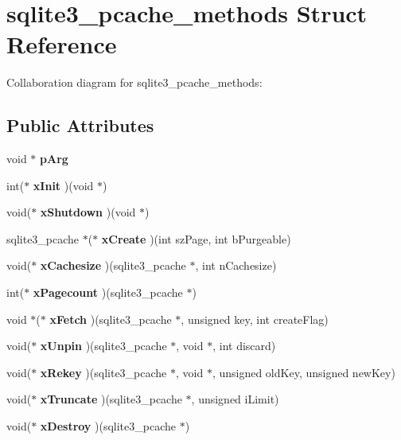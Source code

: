 \section{sqlite3\_\-pcache\_\-methods Struct Reference}
\label{structsqlite3__pcache__methods}
Collaboration diagram for sqlite3\_\-pcache\_\-methods:\subsection*{Public Attributes}
\begin{CompactItemize}
\item 
void $\ast$ {\bf pArg}\label{structsqlite3__pcache__methods_5a7d47e76f80bf2a08cba5fe83b61d2a}

\item 
int($\ast$ \textbf{xInit} )(void $\ast$)\label{structsqlite3__pcache__methods_707c4748dcafc75384a806d13bb68bdd}

\item 
void($\ast$ \textbf{xShutdown} )(void $\ast$)\label{structsqlite3__pcache__methods_34a88425495f42099aadbe3fa9676a06}

\item 
sqlite3\_\-pcache $\ast$($\ast$ \textbf{xCreate} )(int szPage, int bPurgeable)\label{structsqlite3__pcache__methods_95eff7d8c7a094b2dbf030338e284eb3}

\item 
void($\ast$ \textbf{xCachesize} )(sqlite3\_\-pcache $\ast$, int nCachesize)\label{structsqlite3__pcache__methods_1a71e7cecb9abff1fcc9594e0120091b}

\item 
int($\ast$ \textbf{xPagecount} )(sqlite3\_\-pcache $\ast$)\label{structsqlite3__pcache__methods_2b94d01bdb0e2496c486b48a37a00fea}

\item 
void $\ast$($\ast$ \textbf{xFetch} )(sqlite3\_\-pcache $\ast$, unsigned key, int createFlag)\label{structsqlite3__pcache__methods_a00c85f49dc6fbf28c89853e0f40e32b}

\item 
void($\ast$ \textbf{xUnpin} )(sqlite3\_\-pcache $\ast$, void $\ast$, int discard)\label{structsqlite3__pcache__methods_0179cdf335a93eb2be5b94a6c2754a94}

\item 
void($\ast$ \textbf{xRekey} )(sqlite3\_\-pcache $\ast$, void $\ast$, unsigned oldKey, unsigned newKey)\label{structsqlite3__pcache__methods_58ac2c2bfa7cc9811e46368ea0ea73f7}

\item 
void($\ast$ \textbf{xTruncate} )(sqlite3\_\-pcache $\ast$, unsigned iLimit)\label{structsqlite3__pcache__methods_1c61888ab80e7d81e2815f0fea2d87a0}

\item 
void($\ast$ \textbf{xDestroy} )(sqlite3\_\-pcache $\ast$)\label{structsqlite3__pcache__methods_c818e6091765fe201ab5727d515141a7}

\end{CompactItemize}


